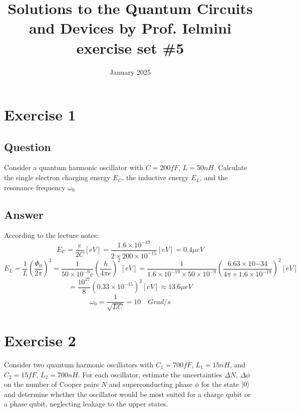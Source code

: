 \documentclass{article}
\title{Solutions to the Quantum Circuits and Devices by Prof. Ielmini exercise set \#5}
\author{}
\date{January 2025}
\begin{document}
\maketitle

\section{Exercise 1}
\subsection{Question}
Consider a quantum harmonic oscillator with $C = 200 fF$, $L = 50 nH$. Calculate the single electron charging energy $E_C$, the inductive energy $E_L$, and the resonance frequency $\omega_0$ 

\subsection{Answer}
According to the lecture notes:
$$E_C = \frac{e}{2C}[eV] = \frac{1.6\times 10^{-19}}{2\times 200\times 10^{-15}}[eV] = 0.4\mu eV$$
$$E_L = \frac{1}{L}(\frac{\Phi_0}{2\pi})^2=\frac{1}{50\times 10^{-9}e}(\frac{h}{4\pi e
})^2 [eV]= \frac{1}{1.6\times 10^{-19}\times 50\times 10^{-9}}(\frac{6.63\times 10{-34}}{4\pi \times 1.6\times 10^{-19}})^2[eV]$$
$$=\frac{10^{27}}{8}(0.33\times 10^{-15})^2 [eV] \approx 13.6\mu eV$$
$$\omega_0 = \frac{1}{\sqrt{LC}} = 10\quad Grad/s$$

\section{Exercise 2}
Consider two quantum harmonic oscillators with $C_1 = 700 fF$, $L_1 = 15 nH$, and $C_2 = 15 fF$, $L_2 = 700 nH$. For each oscillator, estimate the uncertainties $\Delta N$, $\Delta\phi$ on the number of Cooper pairs $N$ and superconducting phase $\phi$ for the state $\ket{0}$ and determine whether the oscillator would be most suited for a charge qubit or a phase qubit, neglecting leakage to the upper states.   
\end{document}

